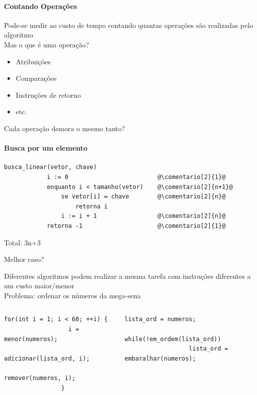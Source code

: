\begin{frame}[label=main]
	\framesubtitle{Contando Operações}

	Pode-se medir ao custo de tempo contando quantas operações são realizadas pelo algoritmo
	\\\vfill
	Mas o que é uma operação?
	\begin{itemize}
		\item Atribuições
		\item Comparações
		\item Instruções de retorno
		\item etc.
	\end{itemize}
	\vfill\pause
	Cada operação demora o mesmo tanto?
\end{frame}

\newcommand{\comentario}[2][1-]{\uncover<#1>{\textcolor{gray}{// #2}}}%
\begin{frame}[fragile,label=main]
	\framesubtitle{Busca por um elemento}

	\begin{center}
	\begin{minipage}{.58\textwidth}
	\begin{lstlisting}[morekeywords={busca_linear,tamanho}] 
		busca_linear(vetor, chave)
		    i := 0                         @\comentario[2]{1}@
		    enquanto i < tamanho(vetor)    @\comentario[2]{n+1}@
		        se vetor[i] = chave        @\comentario[2]{n}@
		            retorna i
		        i := i + 1                 @\comentario[2]{n}@
		    retorna -1                     @\comentario[2]{1}@
	\end{lstlisting}
	\hfill\pause Total: 3n+3
	\end{minipage}
	\end{center}
	\vfill\pause
	Melhor caso?
\end{frame}

\begin{frame}[fragile,label=graduacao]
	Diferentes algoritmos podem realizar a mesma tarefa com instruções diferentes 
	a um custo maior/menor
	\\ \vfill
	Problema: ordenar os números da mega-sena
	\vfill\pause
	\begin{columns}[T]
			\begin{lstlisting}[morekeywords={menor,adicionar,remover}]
				for(int i = 1; i < 60; ++i) {
				  i = menor(numeros);
				  adicionar(lista_ord, i);
				  remover(numeros, i);
				}
			\end{lstlisting}
			\pause
			\begin{lstlisting}[morekeywords={em_ordem,embaralhar}]
				lista_ord = numeros;
				while(!em_ordem(lista_ord))
				  lista_ord = embaralhar(numeros);
			\end{lstlisting}
	\end{columns}
\end{frame}

